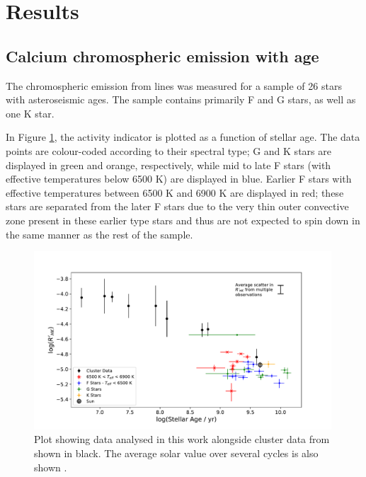 \section{Results}
\label{Chp4_results}

\subsection{Calcium chromospheric emission with age}
\label{Chp4_results_general_results}
The chromospheric emission from \caII lines was measured for a sample of 26 stars with asteroseismic ages. The sample contains primarily F and G stars, as well as one K star.

In Figure \ref{fig:calcium_emission_plot}, the \Rprime activity indicator is plotted as a function of stellar age. The data points are colour-coded according to their spectral type; G and K stars are displayed in green and orange, respectively, while mid to late F stars (with effective temperatures below 6500 K) are displayed in blue. Earlier F stars with effective temperatures between 6500 K and 6900 K are displayed in red; these stars are separated from the later F stars due to the very thin outer convective zone present in these earlier type stars and thus are not expected to spin down in the same manner as the rest of the sample.

\begin{figure}[h]
	\includegraphics[width=0.99\textwidth]{Figures/4-Chromospheric_age/ca_results_with_clusters.pdf}
	\caption{Plot showing data analysed in this work alongside cluster data from \citet{Mamajek_Hillenbrand_2008} shown in black. The average solar value over several cycles is also shown \citep{Egeland_etal_2017}.}
	\centering
	\label{fig:calcium_emission_plot}
\end{figure}


